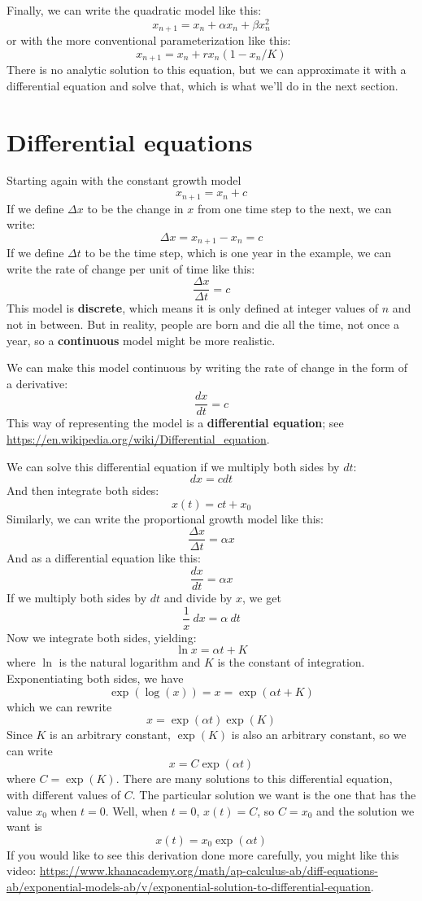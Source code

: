 \documentclass[12pt]{book}
\theoremstyle{exercise}
\begin{document}
Finally, we can write the quadratic model like this:
%
\[ x_{n+1} = x_n + \alpha x_n + \beta x_n^2 \]
%
or with the more conventional parameterization like this:
%
\[ x_{n+1} = x_n + r x_n (1 - x_n / K) \]
%
There is no analytic solution to this equation, but we can approximate it with a differential equation and solve that, which is what we'll do in the next section.


\section{Differential equations}
\label{diffeq}

Starting again with the constant growth model
%
\[ x_{n+1} = x_n + c \]
%
If we define $\Delta x$ to be the change in $x$ from one time step to the next, we can write:
%
\[ \Delta x = x_{n+1} - x_n = c \]
%
If we define $\Delta t$ to be the time step, which is one year in the example, we can write the rate of change per unit of time like this:
%
\[ \frac{\Delta x}{\Delta t} = c \]
%
This model is {\bf discrete}, which means it is only defined at integer values of $n$ and not in between.  But in reality, people are born and die all the time, not once a year, so a {\bf continuous} model might be more realistic.

We can make this model continuous by writing the rate of change in the form of a derivative:
%
\[ \frac{dx}{dt} = c \]
%
This way of representing the model is a {\bf differential equation}; see \url{https://en.wikipedia.org/wiki/Differential_equation}.

We can solve this differential equation if we multiply both sides by $dt$:
%
\[ dx = c dt \]
%
And then integrate both sides:
%
\[ x(t) = c t + x_0 \]
%
Similarly, we can write the proportional growth model like this:
%
\[ \frac{\Delta x}{\Delta t} = \alpha x \]
%
And as a differential equation like this:
%
\[ \frac{dx}{dt} = \alpha x \]
%
If we multiply both sides by $dt$ and divide by $x$, we get
%
\[ \frac{1}{x}~dx = \alpha~dt \] 
%
Now we integrate both sides, yielding:
%
\[ \ln x = \alpha t + K \]
%
where $\ln$ is the natural logarithm and $K$ is the constant of integration.  Exponentiating both sides, we have
%
\[ \exp(\log(x)) = x = \exp(\alpha t + K) \]
%
which we can rewrite
%
\[ x = \exp(\alpha t) \exp(K) \]
%
Since $K$ is an arbitrary constant, $\exp(K)$ is also an arbitrary constant, so we can write
%
\[ x = C \exp(\alpha t) \]
%
where $C = \exp(K)$.  There are many solutions to this differential equation, with different values of $C$.  The particular solution we want is the one that has the value $x_0$ when $t=0$.  Well, when $t=0$, $x(t) = C$, so $C = x_0$ and the solution we want is
%
\[ x(t) = x_0 \exp(\alpha t) \]
%
If you would like to see this derivation done more carefully, you might like this video: \url{https://www.khanacademy.org/math/ap-calculus-ab/diff-equations-ab/exponential-models-ab/v/exponential-solution-to-differential-equation}.
\end{document}
